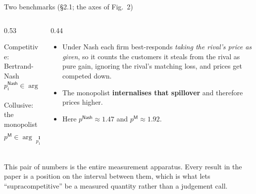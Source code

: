 \documentclass[aspectratio=169,9pt]{beamer}
\newcommand{\blue}[1]{\textcolor{densityblue}{\textbf{#1}}}
\newcommand{\muted}[1]{\textcolor{EPICMuted}{#1}}
\begin{document}
\begin{frame}{Two benchmarks \muted{(\S2.1; the axes of Fig.~2)}}
\begin{columns}[T,totalwidth=\textwidth]
\begin{column}{0.53\textwidth}
\begin{block}{Competitive: Bertrand-Nash}
\[
p^{\mathsf{Nash}}_i \in \arg\max_{p_i}\; \pi_i\!\left(p_i,\, p^{\mathsf{Nash}}_{-i}\right)\ \ \forall i
\]
\end{block}
\begin{block}{Collusive: the monopolist}
\[
p^{\mathsf{M}} \in \arg\max_{p_1,\dots,p_n}\; \sum_{i=1}^{n}\pi_i(p_1,\dots,p_n)
\]
\end{block}
\end{column}
\begin{column}{0.44\textwidth}
\pause
\begin{itemize}
    \item Under Nash each firm best-responds \textit{taking the rival's price as given}, so it counts the
    customers it steals from the rival as pure gain, ignoring the rival's matching loss, and prices get
    competed down.
    \pause
    \item The monopolist \blue{internalises that spillover} and therefore prices higher.
    \pause
    \item Here $p^{\mathsf{Nash}} \approx 1.47$ and $p^{\mathsf{M}} \approx 1.92$.
\end{itemize}
\end{column}
\end{columns}
\vspace{0.2cm}
\pause
\muted{This pair of numbers is the entire measurement apparatus. Every result in the paper is a position on
the interval between them, which is what lets ``supracompetitive'' be a measured quantity rather than a
judgement call.}
\end{frame}
\end{document}
